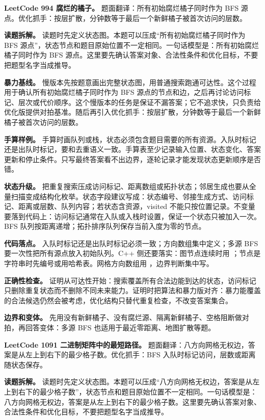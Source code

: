 \noindent\textbf{LeetCode 994 腐烂的橘子。} 题面翻译：所有初始腐烂橘子同时作为 BFS 源点。优化抓手：按层扩散，分钟数等于最后一个新鲜橘子被首次访问的层数。

\textbf{读题拆解。} 读题时先定义状态图。本题可以压成“所有初始腐烂橘子同时作为 BFS 源点”，状态节点和题目原始位置不一定相同。一句话模型是：所有初始腐烂橘子同时作为 BFS 源点。这里要先确认答案对象、合法性条件和优化目标，不要把题型名字当成推导。

\textbf{暴力基线。} 慢版本先按题意画出完整状态图，用普通搜索跑通可达性。这个过程用于确认所有初始腐烂橘子同时作为 BFS 源点的节点和边，之后再讨论访问标记、层次或代价顺序。这个慢版本的任务是保证不漏答案；它不追求快，只负责给优化版提供对拍基准。随后再引入优化抓手：按层扩散，分钟数等于最后一个新鲜橘子被首次访问的层数。

\textbf{手算样例。} 手算时画队列或栈，状态必须包含题目需要的所有资源。入队时标记还是出队时标记，要和去重语义一致。手算表至少记录输入位置、状态变化、答案更新和停止条件。只写最终答案看不出边界，逐轮记录才能发现状态更新顺序是否错。

\textbf{状态升级。} 把重复搜索压成访问标记、距离数组或拓扑状态；邻居生成也要从全量扫描变成结构化枚举。状态字段建议写成：状态编号、邻接生成方式、访问标记、距离或层数、队列内容；若状态含资源，visited 不能只按位置记录。不变量要落到代码上：访问标记通常在入队或入栈时设置，保证一个状态只被加入一次。BFS 队列按距离递增；拓扑排序队列保存当前入度为零的节点。

\textbf{代码落点。} 入队时标记还是出队时标记必须一致；方向数组集中定义；多源 BFS 要一次性把所有源点放入初始队列。C++ 侧还要落实：图节点连续时用 ；节点是字符串时先编号或用哈希表。网格方向数组用 ，边界判断集中写。

\textbf{正确性检查。} 证明从可达性开始：搜索覆盖所有合法边能到达的状态，访问标记只删除重复状态而不删除不同未来能力。证明时把算法和暴力版对齐：暴力能覆盖的合法候选仍然会被考虑，优化结构只替代重复检查，不改变答案集合。

\textbf{边界和变体。} 先用没有新鲜橘子、没有腐烂源、隔离新鲜橘子、空格阻断做对拍，再回答变体：多源 BFS 也适用于最近零距离、地图扩散等题。

\noindent\textbf{LeetCode 1091 二进制矩阵中的最短路径。} 题面翻译：八方向网格无权边，答案是从左上到右下的最少格子数。优化抓手：BFS 入队时标记访问，层数或距离随状态保存。

\textbf{读题拆解。} 读题时先定义状态图。本题可以压成“八方向网格无权边，答案是从左上到右下的最少格子数”，状态节点和题目原始位置不一定相同。一句话模型是：八方向网格无权边，答案是从左上到右下的最少格子数。这里要先确认答案对象、合法性条件和优化目标，不要把题型名字当成推导。

